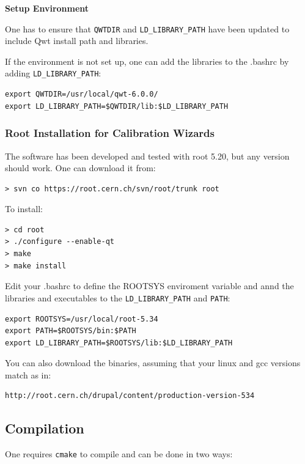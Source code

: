 \documentclass{article}
\begin{document}
\noindent \textbf{Setup Environment} 

\noindent One has to ensure that \verb=QWTDIR= and \verb=LD_LIBRARY_PATH= have
been updated to include Qwt install path and libraries. \bigskip

\noindent If the environment is not set up, one can add the libraries to the
.bashrc by adding \verb=LD_LIBRARY_PATH=:
\begin{verbatim}
export QWTDIR=/usr/local/qwt-6.0.0/
export LD_LIBRARY_PATH=$QWTDIR/lib:$LD_LIBRARY_PATH
\end{verbatim}







\subsubsection{Root Installation for Calibration Wizards}
The software has been developed and tested with root 5.20, but any version
should work. One can download it from:
\begin{verbatim}
> svn co https://root.cern.ch/svn/root/trunk root
\end{verbatim}

\noindent To install:
\begin{verbatim}
> cd root
> ./configure --enable-qt
> make
> make install
\end{verbatim}

Edit your .bashrc to define the ROOTSYS enviroment variable and annd
the libraries and executables to the \verb=LD_LIBRARY_PATH= and \verb=PATH=:
\begin{verbatim}
export ROOTSYS=/usr/local/root-5.34
export PATH=$ROOTSYS/bin:$PATH
export LD_LIBRARY_PATH=$ROOTSYS/lib:$LD_LIBRARY_PATH
\end{verbatim}

You can also download the binaries, assuming that your linux and gcc versions
match as in:
\begin{verbatim}
http://root.cern.ch/drupal/content/production-version-534
\end{verbatim}





\subsection{Compilation}
One requires \verb=cmake= to compile and can be done in two ways:
\end{document}
